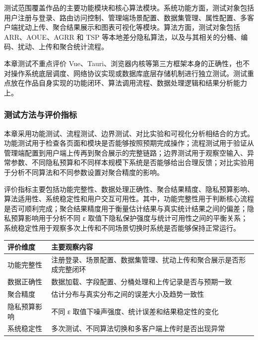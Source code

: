 \documentclass{cumcmthesis}
\numberwithin{equation}{section}
\numberwithin{figure}{section}
\numberwithin{table}{section}
\begin{document}
测试范围覆盖作品的主要功能模块和核心算法模块。系统功能方面，测试对象包括用户注册与登录、路由访问控制、管理端场景配置、数据集管理、属性配置、多客户端扰动上传、聚合结果展示和图表可视化等模块。算法方面，测试对象包括 ARR、AOUE、AGRR 和 TSP 等本地差分隐私算法，以及与其相关的分桶、编码、扰动、上传和聚合统计流程。

本章测试不重点评价 Vue、Tauri、浏览器内核等第三方框架本身的正确性，也不对操作系统底层调度、网络协议实现或数据库底层存储机制进行独立测试。测试重点放在作品自身实现的功能闭环、算法调用流程、数据处理逻辑和结果分析能力上。

\subsubsection{测试方法与评价指标}

本章采用功能测试、流程测试、边界测试、对比实验和可视化分析相结合的方式。功能测试用于检查各页面和模块是否能够按照预期完成操作；流程测试用于验证从管理端配置到用户端上传再到聚合展示的完整链路；边界测试用于观察空输入、异常参数、不同隐私预算和不同样本规模下系统是否能够给出合理反馈；对比实验用于分析不同算法和不同参数设置对聚合精度的影响。

评价指标主要包括功能完整性、数据处理正确性、聚合结果精度、隐私预算影响、算法适用性、系统稳定性和用户交互可用性。其中，功能完整性用于判断核心流程是否可顺利完成；聚合结果精度用于衡量估计结果与真实统计结果之间的偏差；隐私预算影响用于分析不同 ε 取值下隐私保护强度与统计可用性之间的平衡关系；系统稳定性用于观察多次上传和不同场景切换时系统是否能够保持正常运行。

\begin{table}[htbp]
\centering
\small
\begin{tabularx}{\textwidth}{|>{\raggedright\arraybackslash}X|>{\raggedright\arraybackslash}X|}
\hline
评价维度 & 主要观察内容 \\ \hline
功能完整性 & 注册登录、场景配置、数据集管理、扰动上传和聚合展示是否形成完整闭环 \\ \hline
数据正确性 & 数据加载、字段配置、分桶处理和上传记录是否与预期一致 \\ \hline
聚合精度 & 估计分布与真实分布之间的误差大小及趋势一致性 \\ \hline
隐私预算影响 & 不同 ε 取值下噪声强度、统计误差和结果稳定性的变化 \\ \hline
系统稳定性 & 多次测试、不同算法切换和多客户端上传时是否出现异常 \\ \hline
\end{tabularx}
\end{table}
\end{document}
